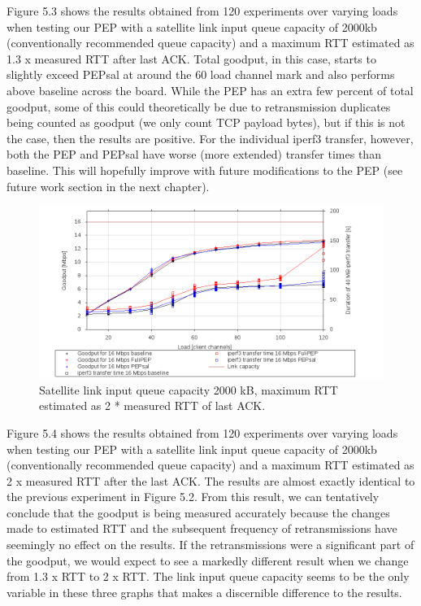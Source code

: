 \documentclass{uathesis}
\begin{document}
Figure 5.3 shows the results obtained from 120 experiments over varying loads when testing our PEP with a satellite link input queue capacity of 2000kb (conventionally recommended queue capacity) and a maximum RTT estimated as 1.3 x measured RTT after last ACK. Total goodput, in this case, starts to slightly exceed PEPsal at around the 60 load channel mark and also performs above baseline across the board. While the PEP has an extra few percent of total goodput, some of this could theoretically be due to retransmission duplicates being counted as goodput (we only count TCP payload bytes), but if this is not the case, then the results are positive. For the individual iperf3 transfer, however, both the PEP and PEPsal have worse (more extended) transfer times than baseline. This will hopefully improve with future modifications to the PEP (see future work section in the next chapter). \\

\begin{figure}[ht!]
    \centering
    \includegraphics[width=1.1\textwidth]{2000k-2.png}
    \caption{Satellite link input queue capacity 2000 kB, maximum RTT estimated as 2 * measured RTT of last ACK.}
    \label{fig: 2000k + 2*RTT} 
\end{figure}

Figure 5.4 shows the results obtained from 120 experiments over varying loads when testing our PEP with a satellite link input queue capacity of 2000kb (conventionally recommended queue capacity) and a maximum RTT estimated as 2 x measured RTT after the last ACK. The results are almost exactly identical to the previous experiment in Figure 5.2. From this result, we can tentatively conclude that the goodput is being measured accurately because the changes made to estimated RTT and the subsequent frequency of retransmissions have seemingly no effect on the results. If the retransmissions were a significant part of the goodput, we would expect to see a markedly different result when we change from 1.3 x RTT to 2 x RTT. The link input queue capacity seems to be the only variable in these three graphs that makes a discernible difference to the results. 
\end{document}
